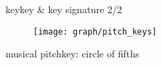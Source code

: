         \begin{frame}{key}{key \& key signature 2/2}
            \vspace{-3mm}
                \begin{figure}[t]
                    \centering
                    \texttt{[image: graph/pitch\_keys]}
                \end{figure}
        \end{frame}
        
        \begin{frame}{musical pitch}{key: circle of fifths}
            \vspace{-9mm}
            \begin{figure}
            \scalebox{.9}
            {
                    \centering
                    
                
            }	
            \end{figure}
        \end{frame}
        

